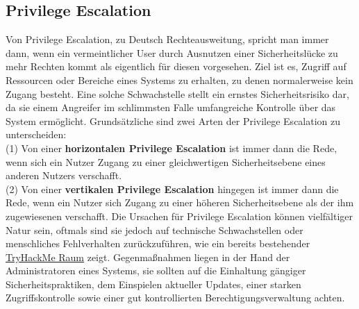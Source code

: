\documentclass[10pt, a4paper,onecolumn ,titlepage]{article}
\begin{document}
    \subsection{Privilege Escalation}
    \label{subsec:PrivilegeEscalation}
    Von Privilege Escalation, zu Deutsch Rechteausweitung, spricht man immer dann, wenn ein vermeintlicher User durch Ausnutzen einer Sicherheitslücke zu mehr Rechten kommt als eigentlich für diesen vorgesehen.
    Ziel ist es, Zugriff auf Ressourcen oder Bereiche eines Systems zu erhalten, zu denen normalerweise kein Zugang besteht.
    Eine solche Schwachstelle stellt ein ernstes Sicherheitsrisiko dar, da sie einem Angreifer im schlimmsten Falle umfangreiche Kontrolle über das System ermöglicht.
    Grundsätzliche sind zwei Arten der Privilege Escalation zu unterscheiden:
    \\
    (1) Von einer \textbf{horizontalen Privilege Escalation} ist immer dann die Rede, wenn sich ein Nutzer Zugang zu einer gleichwertigen Sicherheitsebene eines anderen Nutzers verschafft.
    \\
    (2) Von einer \textbf{vertikalen Privilege Escalation} hingegen ist immer dann die Rede, wenn ein Nutzer sich Zugang zu einer höheren Sicherheitsebene als der ihm zugewiesenen verschafft\parencite{privilegeEscalationArten}.
    Die Ursachen für Privilege Escalation können vielfältiger Natur sein, oftmals sind sie jedoch auf technische Schwachstellen oder menschliches Fehlverhalten zurückzuführen, wie ein bereits bestehender \href{https://tryhackme.com/room/linprivesc}{TryHackMe Raum} zeigt.
    Gegenmaßnahmen liegen in der Hand der Administratoren eines Systems, sie sollten auf die Einhaltung gängiger Sicherheitspraktiken, dem Einspielen aktueller Updates, einer starken Zugriffskontrolle sowie einer gut kontrollierten Berechtigungsverwaltung achten.
\end{document}
